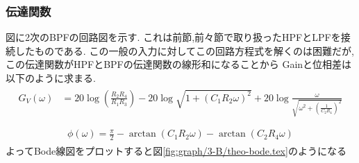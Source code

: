 \subsubsection{伝達関数}
図に2次のBPFの回路図を示す.
これは前節,前々節で取り扱ったHPFとLPFを接続したものである.
この一般の入力に対してこの回路方程式を解くのは困難だが,この伝達関数がHPFとBPFの伝達関数の線形和になることから
Gainと位相差は以下のように求まる.
\begin{align}
  \begin{split}
    G_V(\omega)&=20\log\left(\frac{R_2R_4}{R_1R_3}\right)-20\log\sqrt{1+(C_1R_2\omega)^2}+20\log\frac{\omega}{\sqrt{\omega^2+\left(\frac{1}{C_2R_4}\right)^2}}\\
  \end{split}
\end{align}
\begin{align}
  \begin{split}
    \phi(\omega)=\frac{\pi}{2}-\arctan(C_1R_2\omega)-\arctan(C_2R_4\omega)
  \end{split}
\end{align}
よってBode線図をプロットすると図\ref{fig:graph/3-B/theo-bode.tex}のようになる

